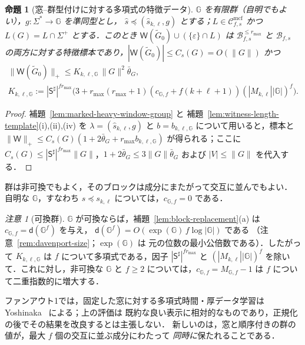 \documentclass[11pt,a4paper]{ltjsarticle}
\numberwithin{equation}{section}
\theoremstyle{plain}
\newtheorem{proposition}[theorem]{命題}
\theoremstyle{definition}
\theoremstyle{remark}
\newtheorem{remark}[theorem]{注意}
\newcommand{\Wit}{\mathsf{W}}
\newcommand{\Cmcf}[2]{\mathcal{C}^{\mathrm{mcf}}_{#1,#2}}
\newcommand{\eps}{\varepsilon}
\theoremstyle{plain}
\begin{document}
\begin{proposition}[窓--群型付けに対する多項式の特徴データ]
\label{thm:window-group-polydata}
${\mathbb G}$ を有限群（自明でもよい），$g:\Sigma^*\to {\mathbb G}$ を準同型とし，
$\widehat s\preceq(\widehat s_{k,\ell},g)$ とする；$L\in\Cmcf{f}{s}$ かつ
$L(G)=L\cap\Sigma^+$ とする．このとき $\Wit(\widetilde G_0)\cup(\{\eps\}\cap L)$ は
$\mathcal B^{\le r_{\max}}_{f,s}$ と
$\mathcal B_{f,s}$ の両方に対する特徴標本であり，$|\Wit(\widetilde G_0)|\le C_s(G)=O(\|G\|)$ かつ
\[
 \begin{gathered}
 \|\Wit(\widetilde G_0)\|_+\le K_{k,\ell,{\mathbb G}}\,\|G\|^2\bar\theta_G,\\
 K_{k,\ell,{\mathbb G}}:=|\mathsf S^\sharp|^{fr_{\max}}
 \bigl(3+r_{\max}(r_{\max}+1)(c_{{\mathbb G},f}+f(k+\ell+1))(|M_{k,\ell}||{\mathbb G}|)^f\bigr).
 \end{gathered}
\]
\end{proposition}

\begin{proof}
補題~\ref{lem:marked-heavy-window-group} と
補題~\ref{lem:witness-length-template}(i),(ii),(iv) を
$\lambda=(\widehat s_{k,\ell},g)$ と $b=b_{k,\ell,{\mathbb G}}$ について用いると，標本と
$\|\Wit\|_+\le C_s(G)(1+2\bar\theta_G+r_{\max}b_{k,\ell,{\mathbb G}})$ が得られる；ここに
$C_s(G)\le|\mathsf S^\sharp|^{fr_{\max}}\|G\|$，$1+2\bar\theta_G\le3\|G\|\bar\theta_G$ および
$|V|\le\|G\|$ を代入する．
\end{proof}

群は非可換でもよく，そのブロックは成分にまたがって交互に並んでもよい．
自明な ${\mathbb G}$，すなわち $s\preceq s_{k,\ell}$ については，$c_{{\mathbb G},f}=0$ である．

\begin{remark}[可換群]
\label{rem:window-abelian}
${\mathbb G}$ が可換ならば，補題~\ref{lem:block-replacement}(a) は
$c_{{\mathbb G},f}=\mathsf d({\mathbb G}^f)$ を与え，
$\mathsf d({\mathbb G}^f)=O(\exp({\mathbb G})\,f\log|{\mathbb G}|)$ である
（注意~\ref{rem:davenport-size}；$\exp({\mathbb G})$ は
元の位数の最小公倍数である）．したがって $K_{k,\ell,{\mathbb G}}$ は $f$ について多項式である，因子
$|\mathsf S^\sharp|^{fr_{\max}}$ と $(|M_{k,\ell}||{\mathbb G}|)^f$ を除いて．これに対し，非可換な
${\mathbb G}$ と $f\ge2$ については，$c_{{\mathbb G},f}=M_{{\mathbb G},f}-1$ は $f$ について二重指数的に増大する．
\end{remark}

ファンアウト1では，固定した窓に対する多項式時間・厚データ学習は
Yoshinaka~\cite[Theorem~1]{Yoshinaka2008} による；上の評価は
既約な良い表示に相対的なものであり，正規化の後でその結果を改良するとは主張しない．
新しいのは，窓と順序付きの群の値が，最大 $f$ 個の交互に並ぶ成分にわたって
\emph{同時に}保たれることである．
\end{document}
